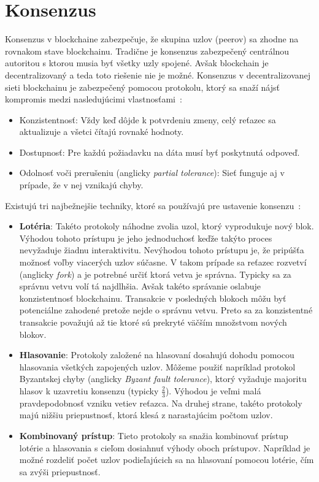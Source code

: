 \section{Konsenzus}\label{sec:consenzus}
Konsenzus v blockchaine zabezpečuje, že skupina uzlov (peerov) sa  zhodne na rovnakom stave blockchainu. Tradične je konsenzus zabezpečený centrálnou autoritou s ktorou musia byť všetky uzly spojené. Avšak blockchain je decentralizovaný a teda toto riešenie nie je možné. Konsenzus v decentralizovanej sieti blockchainu je zabezpečený pomocou protokolu, ktorý sa snaží nájsť kompromis medzi nasledujúcimi vlastnosťami~\cite{gilbertCAP, zhangConsensus, leporeConsensus}:
\begin{itemize}
	\item Konzistentnosť: Vždy keď dôjde k potvrdeniu zmeny, celý reťazec sa aktualizuje a všetci čítajú rovnaké hodnoty.
	\item Dostupnosť: Pre každú požiadavku na dáta musí byť poskytnutá odpoveď.
	\item Odolnosť voči prerušeniu (anglicky \textit{partial tolerance}): Sieť funguje aj v prípade, že v nej vznikajú chyby.
\end{itemize}

Existujú tri najbežnejšie techniky, ktoré sa používajú pre ustavenie konsenzu~\cite{homoliakBlockchain}:
\begin{itemize}
	\item \textbf{Lotéria}: Takéto protokoly náhodne zvolia uzol, ktorý vyprodukuje nový blok. Výhodou tohoto prístupu je jeho jednoduchosť keďže takýto proces nevyžaduje žiadnu interaktivitu. Nevýhodou tohoto prístupu je, že pripúšťa možnosť voľby viacerých uzlov súčasne. V takom prípade sa reťazec rozvetví (anglicky \textit{fork}) a je potrebné určiť ktorá vetva je správna. Typicky sa za správnu vetvu volí tá najdlhšia. Avšak takéto správanie oslabuje konzistentnosť blockchainu. Transakcie v posledných blokoch môžu byť potenciálne zahodené pretože nejde o správnu vetvu. Preto sa za konzistentné transakcie považujú až tie ktoré sú prekryté väčším množstvom nových blokov.
	\item \textbf{Hlasovanie}: Protokoly založené na hlasovaní dosahujú dohodu pomocou hlasovania všetkých zapojených uzlov. Môžeme použiť napríklad protokol Byzantskej chyby (anglicky \textit{Byzant fault tolerance}), ktorý vyžaduje majoritu hlasov k uzavretiu konsenzu (typicky $\frac{2}{3}$). Výhodou je veľmi malá pravdepodobnosť vzniku vetiev reťazca. Na druhej strane, takéto protokoly majú nižšiu priepustnosť, ktorá klesá z narastajúcim počtom uzlov.
	\item \textbf{Kombinovaný prístup}: Tieto protokoly sa snažia kombinovať prístup lotérie a hlasovania s cieľom dosiahnuť výhody oboch prístupov. Napríklad je možné rozdeliť počet uzlov podieľajúcich sa na hlasovaní pomocou lotérie, čím sa zvýši priepustnosť.
\end{itemize}
~\cite{zhangConsensus, homoliakBlockchain}

